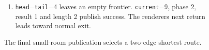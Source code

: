 \begin{figure}[htbp]
\begin{minipage}{\linewidth}
\begin{enumerate}
      \item \texttt{head}=\texttt{tail}=4 leaves an empty frontier. \texttt{current}=9, phase 2, result 1 and length 2 publish success. The renderer\textquotesingle s next return leads toward normal exit.
    \end{enumerate}
  \end{minipage}
  \caption{The final small-room publication selects a two-edge shortest route.}
  \label{capture:010-maze-explorer-f03-path}
  \label{maze-f03-path}
\end{figure}
\par
